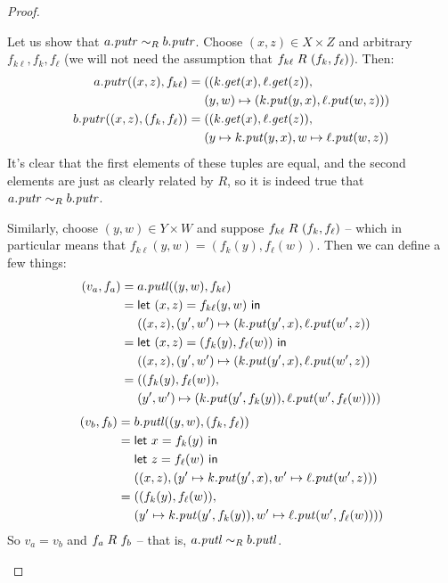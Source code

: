 \begin{defn}[$R$-similarity]
\begin{theorem}
\begin{lemma}
\begin{theorem}[No products]
\begin{lemma}
\begin{defn}
\begin{theorem}
\begin{theorem}
\begin{corollary}[Hylomorphism]
\begin{defn}
\begin{defn}
\begin{defn}[Symmetrization]
\begin{proof}
\begin{longenum}
Let us show that $a.\mathit{putr} \sim_R b.\mathit{putr}$. Choose $(x,z) \in X \times Z$ and
arbitrary $f_{k\ell},f_k,f_\ell$ (we will not need the assumption that
$f_{k\ell} \mathrel{R_{}} (f_k,f_\ell)$). Then:
\begin{align*}
    a.\mathit{putr}((x,z),f_{k\ell}) ={}
    & ((k.\mathit{get}(x),\ell.\mathit{get}(z)), \\
    & (y,w) \mapsto (k.\mathit{put}(y,x),\ell.\mathit{put}(w,z))) \\
    b.\mathit{putr}((x,z),(f_k,f_\ell)) ={}
    & ((k.\mathit{get}(x),\ell.\mathit{get}(z)), \\
    & (y \mapsto k.\mathit{put}(y,x),w \mapsto \ell.\mathit{put}(w,z))
\end{align*}
It's clear that the first elements of these tuples are equal, and the second
elements are just as clearly related by $R$, so it is indeed true that
$a.\mathit{putr} \sim_R b.\mathit{putr}$.

Similarly, choose $(y,w) \in Y \times W$ and suppose $f_{k\ell} \mathrel{R_{}}
(f_k,f_\ell)$ -- which in particular means that
$f_{k\ell}(y,w)=(f_k(y),f_\ell(w))$. Then we can define a few things:
\begin{align*}
    (v_a,f_a) ={}
    & a.\mathit{putl}((y,w),f_{k\ell}) \\
    ={}
    & \mathsf{let}\  (x,z) = f_{k\ell}(y,w) \ \mathsf{in} \\
    & ((x,z), (y',w') \mapsto (k.\mathit{put}(y',x),\ell.\mathit{put}(w',z)) \\
    ={}
    & \mathsf{let}\  (x,z) = (f_k(y),f_\ell(w)) \ \mathsf{in} \\
    & ((x,z), (y',w') \mapsto (k.\mathit{put}(y',x),\ell.\mathit{put}(w',z)) \\
    ={}
    & ((f_k(y),f_\ell(w)), \\
    & (y',w') \mapsto (k.\mathit{put}(y',f_k(y)),\ell.\mathit{put}(w',f_\ell(w)))) \\
\end{align*}
\begin{align*}
    (v_b,f_b) ={}
    & b.\mathit{putl}((y,w),(f_k,f_\ell)) \\
    ={}
    & \mathsf{let}\  x = f_k(y) \ \mathsf{in} \\
    & \mathsf{let}\  z = f_\ell(w) \ \mathsf{in} \\
    & ((x,z),(y' \mapsto k.\mathit{put}(y',x),w' \mapsto \ell.\mathit{put}(w',z))) \\
    ={}
    & ((f_k(y),f_\ell(w)), \\
    & (y' \mapsto k.\mathit{put}(y',f_k(y)),w' \mapsto \ell.\mathit{put}(w',f_\ell(w))))
\end{align*}
So $v_a=v_b$ and $f_a \mathrel{R_{}} f_b$ -- that is, $a.\mathit{putl} \sim_R b.\mathit{putl}$.


\end{longenum}
\end{proof}
\end{defn}
\end{defn}
\end{defn}
\end{corollary}
\end{theorem}
\end{theorem}
\end{defn}
\end{lemma}
\end{theorem}
\end{lemma}
\end{theorem}
\end{defn}
